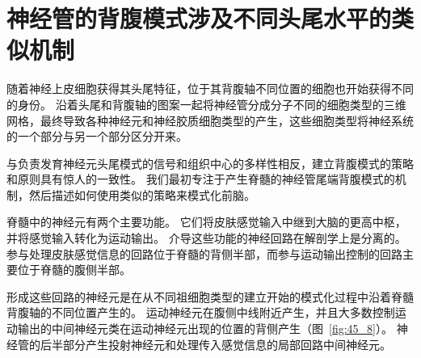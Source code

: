 \section{神经管的背腹模式涉及不同头尾水平的类似机制}

随着神经上皮细胞获得其头尾特征，位于其背腹轴不同位置的细胞也开始获得不同的身份。
沿着头尾和背腹轴的图案一起将神经管分成分子不同的细胞类型的三维网格，最终导致各种神经元和神经胶质细胞类型的产生，这些细胞类型将神经系统的一个部分与另一个部分区分开来。


与负责发育神经元头尾模式的信号和组织中心的多样性相反，建立背腹模式的策略和原则具有惊人的一致性。
我们最初专注于产生脊髓的神经管尾端背腹模式的机制，然后描述如何使用类似的策略来模式化前脑。


脊髓中的神经元有两个主要功能。
它们将皮肤感觉输入中继到大脑的更高中枢，并将感觉输入转化为运动输出。
介导这些功能的神经回路在解剖学上是分离的。
参与处理皮肤感觉信息的回路位于脊髓的背侧半部，而参与运动输出控制的回路主要位于脊髓的腹侧半部。


形成这些回路的神经元是在从不同祖细胞类型的建立开始的模式化过程中沿着脊髓背腹轴的不同位置产生的。
运动神经元在腹侧中线附近产生，并且大多数控制运动输出的中间神经元类在运动神经元出现的位置的背侧产生（图~\ref{fig:45_8}）。
神经管的后半部分产生投射神经元和处理传入感觉信息的局部回路中间神经元。


